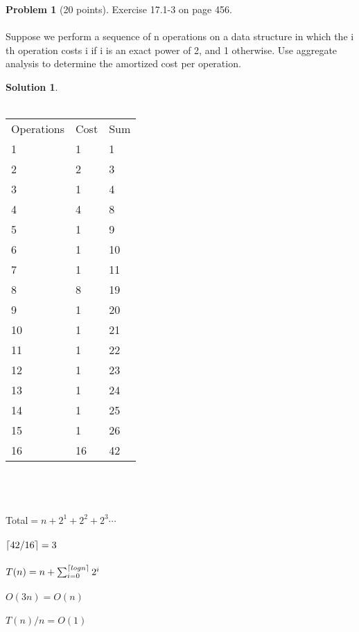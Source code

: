 \documentclass{article}
\DeclarePairedDelimiter{\ceil}{\lceil}{\rceil}
\theoremstyle{definition}
\newtheorem{problem}{Problem}
\newtheorem*{solution}{Solution}
\begin{document}
\newpage

\begin{problem}[20 points]
Exercise 17.1-3 on page 456.\\
\\
Suppose we perform a sequence of n operations on a data structure in which the i th operation costs i if i is an exact power of 2, and 1 otherwise. Use aggregate analysis to determine the amortized cost per operation.
\end{problem}

\begin{solution} \\
\\



\begin{tabular}{lll}
Operations & Cost & Sum  \\
1          & 1    &    1         \\
2          & 2    & 3        \\
3          & 1    &   4          \\
4          & 4    &   8          \\
5          & 1    &   9          \\
6          & 1    &   10          \\
7          & 1    &     11        \\
8          & 8    &       19      \\
9          & 1    &         20    \\
10         & 1    &           21  \\
11         & 1    &             22\\
12         & 1    & 23            \\
13         & 1    &   24          \\
14         & 1    &     25        \\
15         & 1    &       26      \\
16         & 16   &  42 \\
\end{tabular}\\
\\
\\
Total$ = n + 2^1 + 2^2 + 2^3\cdots$ \\
\\
$\ceil{42/16} = 3$\\ 
\\
$T(n) = n + \sum_{i=0}^{\ceil{logn}} 2^{i}$\\
\\
$O(3n) = O( n )$\\
\\
$T(n)/n = O(1) $
\\

\end{solution}
\end{document}

